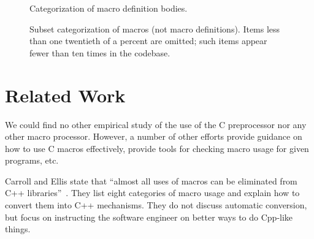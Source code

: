 \documentclass[11pt]{article}
\begin{document}


\begin{figure}
\centerline{}
\caption{Categorization of macro definition bodies.}
\label{fig:categorization}
\end{figure}







\begin{figure}
{\small\centerline{}}
\caption{Subset categorization of macros (not macro definitions).   Items
  less than one twentieth of a percent are omitted; such items appear
  fewer than ten times in the codebase.}
\label{fig:subset-categories}
\end{figure}
 



\section{Related Work}
\label{sec:related}

We could find no other empirical study of the use of the C preprocessor nor
any other macro processor.  However, a number of other efforts provide
guidance on how to use C macros effectively, provide tools for
checking macro usage for given programs, etc.

Carroll and Ellis state that ``almost all uses of macros can be
eliminated from C++ libraries''~\cite[p.~146]{Carroll95}. 
They list eight categories of macro usage and explain how to convert
them into C++ mechanisms.  They do not
discuss automatic conversion, but  focus on instructing the
software engineer on better ways to do Cpp-like things.
\end{document}
